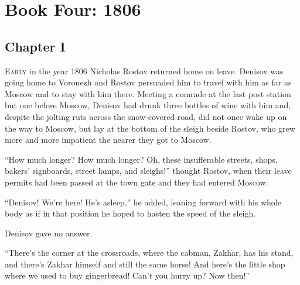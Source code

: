 \part*{Book Four: 1806}


\chapter*{Chapter I}
\ifaudio
{} 
\fi

\lettrine[lines=2, loversize=0.3, lraise=0]{\initfamily E}{arly}
in the year 1806 Nicholas Rostov returned home on
leave. Denisov was going home to Voronezh and Rostov persuaded
him to travel with him as far as Moscow and to stay with him
there. Meeting a comrade at the last post station but one before
Moscow, Denisov had drunk three bottles of wine with him and,
despite the jolting ruts across the snow-covered road, did not
once wake up on the way to Moscow, but lay at the bottom of the
sleigh beside Rostov, who grew more and more impatient the nearer
they got to Moscow.

``How much longer? How much longer? Oh, these insufferable
streets, shops, bakers' signboards, street lamps, and sleighs!''
thought Rostov, when their leave permits had been passed at the
town gate and they had entered Moscow.

``Denisov! We're here! He's asleep,'' he added, leaning forward
with his whole body as if in that position he hoped to hasten the
speed of the sleigh.

Denisov gave no answer.

``There's the corner at the crossroads, where the cabman, Zakhar,
has his stand, and there's Zakhar himself and still the same
horse! And here's the little shop where we used to buy
gingerbread! Can't you hurry up?  Now then!''

